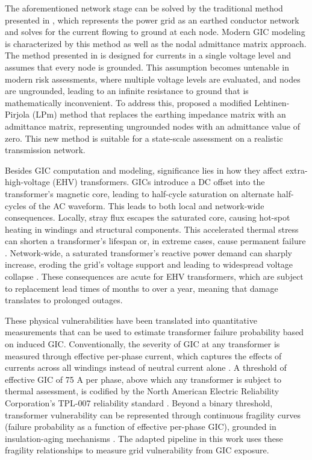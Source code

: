\documentclass[draft]{agujournal2019}
\begin{document}
The aforementioned network stage can be solved by the traditional method presented in , which represents the power grid as an earthed conductor network and solves for the current flowing to ground at each node. Modern GIC modeling is characterized by this method as well as the nodal admittance matrix approach. The method presented in  is designed for currents in a single voltage level and assumes that every node is grounded. This assumption becomes untenable in modern risk assessments, where multiple voltage levels are evaluated, and nodes are ungrounded, leading to an infinite resistance to ground that is mathematically inconvenient. To address this,  proposed a modified Lehtinen-Pirjola (LPm) method that replaces the earthing impedance matrix with an admittance matrix, representing ungrounded nodes with an admittance value of zero. This new method is suitable for a state-scale assessment on a realistic transmission network. 

Besides GIC computation and modeling, significance lies in how they affect extra-high-voltage (EHV) transformers. GICs introduce a DC offset into the transformer's magnetic core, leading to half-cycle saturation on alternate half-cycles of the AC waveform. This leads to both local and network-wide consequences. Locally, stray flux escapes the saturated core, causing hot-spot heating in windings and structural components. This accelerated thermal stress can shorten a transformer's lifespan or, in extreme cases, cause permanent failure \cite{Dehghanian2021}. Network-wide, a saturated transformer's reactive power demand can sharply increase, eroding the grid's voltage support and leading to widespread voltage collapse \cite{Overbye2012}. These consequences are acute for EHV transformers, which are subject to replacement lead times of months to over a year, meaning that damage translates to prolonged outages.

These physical vulnerabilities have been translated into quantitative measurements that can be used to estimate transformer failure probability based on induced GIC. Conventionally, the severity of GIC at any transformer is measured through effective per-phase current, which captures the effects of currents across all windings instead of neutral current alone \cite{Klauber2020AGE}. A threshold of effective GIC of 75 A per phase, above which any transformer is subject to thermal assessment, is codified by the North American Electric Reliability Corporation's TPL-007 reliability standard \cite{NERC2014}. Beyond a binary threshold, transformer vulnerability can be represented through continuous fragility curves (failure probability as a function of effective per-phase GIC), grounded in insulation-aging mechanisms \cite{Gaunt2016}. The adapted pipeline in this work uses these fragility relationships to measure grid vulnerability from GIC exposure. 
\end{document}
